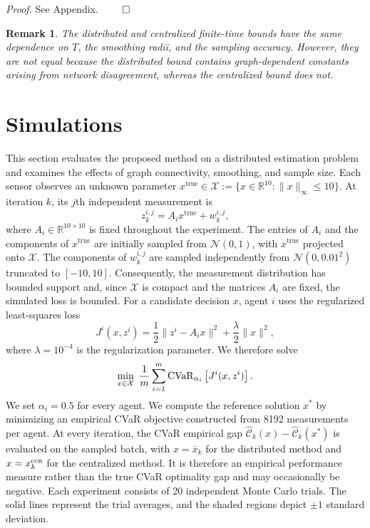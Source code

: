 \documentclass[twocolumn]{autart}    %
\newcommand{\brk}[1]{\left[#1\right]}
\newtheorem{remark}{Remark}
\newcommand{\1}{\mathbf{1}}
\begin{document}
\textit{Proof.} 
See Appendix.
\hfill $\qed$
\begin{remark}   
The distributed and centralized finite-time bounds have the same dependence on $T$, the smoothing radii, and the sampling accuracy. However, they are not equal because the distributed bound contains graph-dependent constants arising from network disagreement, whereas the centralized bound does not.
\end{remark}
\section{Simulations}\label{sec:simulation}
This section evaluates the proposed method on a distributed estimation problem~\cite{xu2017convergence} and examines the effects of graph connectivity, smoothing, and sample size.
%
%
Each sensor observes an unknown parameter $x^{\mathrm{true}}\in\mathcal X:=\{x\in\mathbb R^{10}:\|x\|_\infty\leq10\}$. At iteration $k$, its $j$th independent measurement is
\begin{equation*}
z_k^{i,j}=A_i x^{\mathrm{true}}+w_k^{i,j},
\end{equation*}
where $A_i\in\mathbb R^{10\times10}$ is fixed throughout the experiment. The entries of $A_i$ and the components of $x^{\mathrm{true}}$ are initially sampled from $\mathcal N(0,1)$, with $x^{\mathrm{true}}$ projected onto $\mathcal X$. The components of $w_k^{i,j}$ are sampled independently from $\mathcal N(0,0.01^2)$ truncated to $[-10,10]$. Consequently, the measurement distribution has bounded support and, since $\mathcal X$ is compact and the matrices $A_i$ are fixed, the simulated loss is bounded.
For a candidate decision $x$, agent $i$ uses the regularized least-squares loss
\begin{equation*}
J^i(x,z^i)=\frac12\|z^i-A_i x\|^2+\frac{\lambda}{2}\|x\|^2,
\end{equation*}
where $\lambda=10^{-4}$ is the regularization parameter. We therefore solve
\begin{align*}
\mathop{\min}_{x\in\mathcal X}\ \frac1m\sum_{i=1}^m
{\rm CVaR}_{\alpha_i}\brk{J^i(x,z^i)}.
\end{align*}
We set $\alpha_i=0.5$ for every agent. 
We compute the reference solution $x^\ast$ by minimizing an empirical CVaR objective constructed from 8192 measurements per agent.
At every iteration, 
the CVaR empirical gap $\widehat{\mathcal C}_k(x)-\widehat{\mathcal C}_k(x^\ast)$ 
is evaluated on the sampled batch, 
with $x=\bar x_k$ for the distributed method and $x=x_k^{\rm cen}$ for the centralized method. 
It is therefore an empirical performance measure rather than the true CVaR optimality gap
and may occasionally be negative.
Each experiment consists of 20 independent Monte Carlo trials. 
The solid lines represent the trial averages, 
and the shaded regions depict $\pm1$ standard deviation. 
\end{document}
